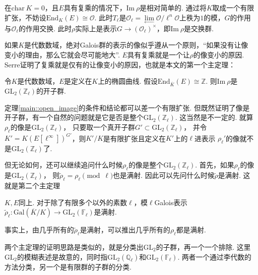 在$\mathrm{char}\ K = 0$，且$E$具有复乘的情况下，$\mathrm{Im}\ \rho$是相对简单的. 通过将$K$取成一个有限扩张，不妨设$\mathrm{End}_K(E) \cong \mathcal{O}$. 此时$T_{\ell}$是$\mathcal{O}_{\ell} = \lim\limits_{\longleftarrow}\mathcal{O}/\ell^n \mathcal{O}$上秩为$1$的模，$G$的作用与$\mathcal{O}_{\ell}$的作用交换. 此时$\rho$实际上是表示$G\to (\mathcal{O}_{\ell})^{\times}$，即$\mathrm{Im}\ \rho$是交换群.

如果$K$是代数数域，绝对Galois群的表示的像似乎遵从一个原则，“如果没有让像变小的理由，那么它就会尽可能地大”. $E$具有复乘就是一个让$\rho$的像变小的原因. Serre证明了复乘就是仅有的让像变小的原因，也就是本文的第一个主定理：

\begin{cthm}
    令$K$是代数数域，$E$是定义在$K$上的椭圆曲线. 假设$\mathrm{End}_{\overline{K}}(E) \cong \mathbb{Z}$. 则$\mathrm{Im}\ \rho$是$\mathrm{GL}_2(\mathbb{Z}_{\ell})$的开子群. \label{main::open_image}
\end{cthm}

定理\ref{main::open_image}的条件和结论都可以差一个有限扩张.
但既然证明了像是开子群，有一个自然的问题就是它是否是整个$\mathrm{GL}_2(\mathbb{Z}_{\ell})$.
这当然是不一定的. 就算$\rho_{\ell}$的像是$\mathrm{GL}_2(\mathbb{Z}_{\ell})$，
只要取一个真开子群$G'\subset \mathrm{GL}_2(\mathbb{Z}_{\ell})$，
并令$K' = K(E[\ell^{\infty}])^{G'}$，则$K'/K$是有限扩张且定义在$K'$上的$\ell$进表示
$\rho_{\ell}'$的像就不是$\mathrm{GL}_2(\mathbb{Z}_{\ell})$了.

但无论如何，还可以继续追问什么时候$\rho_{\ell}$的像是整个$\mathrm{GL}_2(\mathbb{Z}_{\ell})$.
首先，如果$\rho_{\ell}$的像是$\mathrm{GL}_2(\mathbb{Z}_{\ell})$，
则$\tilde{\rho}_{\ell} = \rho_{\ell} \pmod{\ell}$也是满射.
因此可以先问什么时候$\tilde{\rho}$是满射. 这就是第二个主定理

\begin{cthm}
    $K, E$同上. 对于除了有限多个以外的素数$\ell$，模$\ell$\quad Galois表示$\tilde{\rho}_{\ell}: \mathrm{Gal}(\overline{K}/K)\to \mathrm{GL}_2(\mathbb{F}_{\ell})$是满射. \label{main::surjective}
\end{cthm}

事实上，由几乎所有的$\tilde{\rho}_{\ell}$是满射，可以推出几乎所有的$\rho_{\ell}$都是满射.

两个主定理的证明思路是类似的，就是分类出$\mathrm{GL}_2$的子群，再一个一个排除. 这里$\mathrm{GL}_2$的模糊表述是故意的，同时指$\mathrm{GL}_2(\mathbb{Q}_{\ell})$和$\mathrm{GL}_2(\mathbb{F}_{\ell})$. 两者一个通过李代数的方法分类，另一个是有限群的子群的分类.

